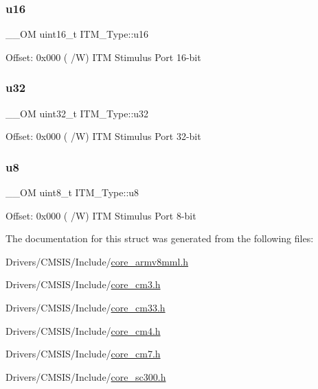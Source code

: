 \subsubsection{\texorpdfstring{u16}{u16}}
{\footnotesize\ttfamily \+\_\+\+\_\+\+OM uint16\+\_\+t I\+T\+M\+\_\+\+Type\+::u16}

Offset\+: 0x000 ( /W) I\+TM Stimulus Port 16-\/bit \mbox{\label{struct_i_t_m___type_a5834885903a557674f078f3b71fa8bc8}} 
\subsubsection{\texorpdfstring{u32}{u32}}
{\footnotesize\ttfamily \+\_\+\+\_\+\+OM uint32\+\_\+t I\+T\+M\+\_\+\+Type\+::u32}

Offset\+: 0x000 ( /W) I\+TM Stimulus Port 32-\/bit \mbox{\label{struct_i_t_m___type_ae773bf9f9dac64e6c28b14aa39f74275}} 
\subsubsection{\texorpdfstring{u8}{u8}}
{\footnotesize\ttfamily \+\_\+\+\_\+\+OM uint8\+\_\+t I\+T\+M\+\_\+\+Type\+::u8}

Offset\+: 0x000 ( /W) I\+TM Stimulus Port 8-\/bit 

The documentation for this struct was generated from the following files\+:\begin{DoxyCompactItemize}
\item 
Drivers/\+C\+M\+S\+I\+S/\+Include/\mbox{\hyperlink{core__armv8mml_8h}{core\+\_\+armv8mml.\+h}}\item 
Drivers/\+C\+M\+S\+I\+S/\+Include/\mbox{\hyperlink{core__cm3_8h}{core\+\_\+cm3.\+h}}\item 
Drivers/\+C\+M\+S\+I\+S/\+Include/\mbox{\hyperlink{core__cm33_8h}{core\+\_\+cm33.\+h}}\item 
Drivers/\+C\+M\+S\+I\+S/\+Include/\mbox{\hyperlink{core__cm4_8h}{core\+\_\+cm4.\+h}}\item 
Drivers/\+C\+M\+S\+I\+S/\+Include/\mbox{\hyperlink{core__cm7_8h}{core\+\_\+cm7.\+h}}\item 
Drivers/\+C\+M\+S\+I\+S/\+Include/\mbox{\hyperlink{core__sc300_8h}{core\+\_\+sc300.\+h}}\end{DoxyCompactItemize}
